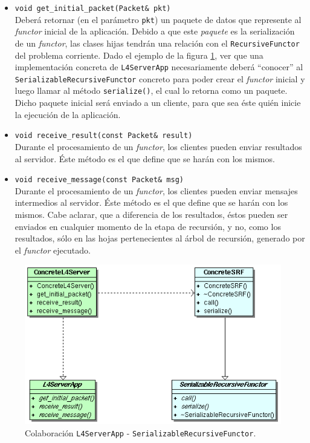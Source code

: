 \begin{itemize}
    \item \texttt{void get\_initial\_packet(Packet\& pkt)}\\[0.2cm]
                Deberá retornar (en el parámetro \texttt{pkt}) un paquete de datos que represente al \textit{functor} inicial de la
                aplicación. Debido a que este \textit{paquete} es la serialización de un \textit{functor}, las clases hijas tendrán una
                relación con el \texttt{RecursiveFunctor} del problema corriente. Dado el ejemplo de la figura
                \ref{l4_server_app_with_srf}, ver que una implementación concreta de \texttt{L4ServerApp} necesariamente deberá ``conocer''
                al \texttt{SerializableRecursiveFunctor} concreto para poder crear el \textit{functor} inicial y luego llamar al método
                \texttt{serialize()}, el cual lo retorna como un paquete. Dicho paquete inicial será enviado a un cliente, para que sea éste
                quién inicie la ejecución  de la aplicación.
    \item \texttt{void receive\_result(const Packet\& result)}\\[0.2cm]
                Durante el procesamiento de un \textit{functor}, los clientes pueden enviar resultados al servidor. Éste método es el que
                define que se harán con los mismos.
    \item \texttt{void receive\_message(const Packet\& msg)}\\[0.2cm]
                Durante el procesamiento de un \textit{functor}, los clientes pueden enviar mensajes intermedios al servidor. Éste método es
                el que define que se harán con los mismos. Cabe aclarar, que a diferencia de los resultados, éstos pueden ser enviados en
                cualquier momento de la etapa de recursión, y no, como los resultados, sólo en las hojas pertenecientes al árbol de
                recursión, generado por el \textit{functor} ejecutado.
\end{itemize}

\begin{figure}[ht] \hspace{1.8cm}
    \includegraphics[scale=.6]{images/l4_server_app_with_srf.png}
    \caption{Colaboración \texttt{L4ServerApp} - \texttt{SerializableRecursiveFunctor}.}
    \label{l4_server_app_with_srf}
\end{figure}


